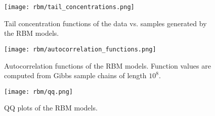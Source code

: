 \begin{figure}[!htb]
    \begin{center}
        \texttt{[image: rbm/tail\_concentrations.png]}
    \end{center}
    \caption{Tail concentration functions of the data vs. samples generated by the RBM models.}
    \label{fig:rbm_tail_concentrations}
\end{figure}

\begin{figure}[!htb]
    \begin{center}
        \texttt{[image: rbm/autocorrelation\_functions.png]}
    \end{center}
    \caption{Autocorrelation functions of the RBM models. Function values are computed from Gibbs sample chains of length \( 10^8 \).}
    \label{fig:rbm_autocorrelation_functions}
\end{figure}

\begin{figure}[!htb]
    \begin{center}
        \texttt{[image: rbm/qq.png]}
    \end{center}
    \caption{QQ plots of the RBM models.}
    \label{fig:rbm_qq_plots}
\end{figure}
